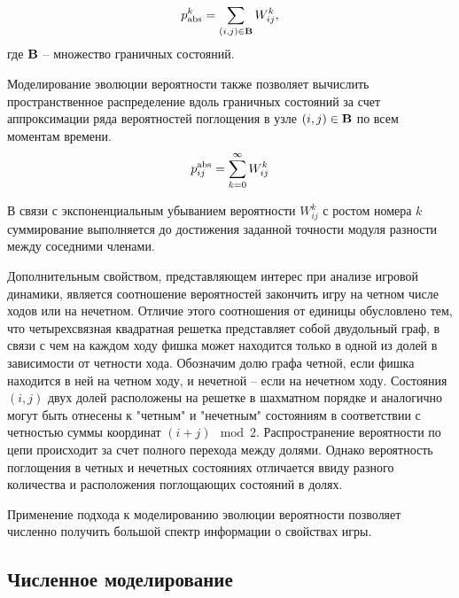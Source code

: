 \begin{equation}
    \begin{aligned}
    p_{\rm abs}^{k}=\sum_{(i, j) \in {\bf B}} W_{ij}^{k},
    \label{eq:timedistr}
    \end{aligned}
\end{equation}
где ${\bf B}$ -- множество граничных состояний.

Моделирование эволюции вероятности также позволяет вычислить пространственное распределение вдоль граничных состояний за
счет аппроксимации ряда вероятностей поглощения в узле $(i, j) \in {\bf B}$ по всем моментам времени.
\begin{equation}
    \begin{aligned}
    p_{ij}^{\rm abs}=\sum_{k=0}^{\infty} W_{ij}^{k}
    \label{eq:spacedistr}
    \end{aligned}
\end{equation}

В связи с экспоненциальным убыванием вероятности $W_{ij}^{k}$ с ростом номера $k$ суммирование выполняется до достижения заданной точности
модуля разности между соседними членами.

Дополнительным свойством, представляющем интерес при анализе игровой динамики, является соотношение вероятностей
закончить игру на четном числе ходов или на нечетном. Отличие этого соотношения от единицы обусловлено 
тем, что четырехсвязная квадратная решетка представляет собой двудольный граф,
в связи с чем на каждом ходу фишка может находится только в одной из долей в зависимости от четности хода.
Обозначим долю графа четной, если фишка находится в ней на четном ходу, и нечетной -- если на нечетном ходу.
Состояния $(i, j)$ двух долей расположены на решетке в шахматном порядке и аналогично могут быть отнесены
к "четным" и "нечетным" состояниям в соответствии с четностью суммы координат $(i + j) \mod 2$.
Распространение вероятности по цепи происходит за счет полного перехода между долями. 
Однако вероятность поглощения в четных и нечетных состояниях отличается ввиду разного количества и расположения поглощающих состояний в долях.

Применение подхода к моделированию эволюции вероятности позволяет численно получить большой спектр информации о свойствах игры.

\subsection{Численное моделирование}\label{subsec:ch1/sec3/sub4}

